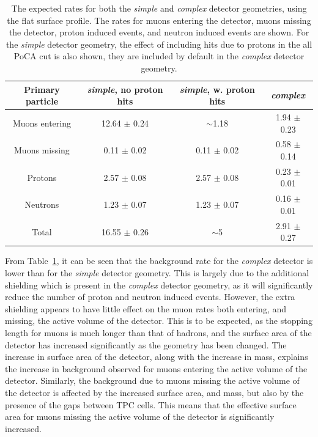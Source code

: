 \begin{table}[h!]
  \caption[The expected rates for both the \emph{simple} and \emph{complex} detector geometries, using the flat surface profile]
          {The expected rates for both the \emph{simple} and \emph{complex} detector geometries, using the flat surface profile. The rates for muons entering the detector, muons missing the detector, proton induced events, and neutron induced events are shown. For the \emph{simple} detector geometry, the effect of including hits due to protons in the all PoCA cut is also shown, they are included by default in the \emph{complex} detector geometry.}
  \centering
  \label{tab:SimpSurfRates}
  \begin{tabular}{c c c c}
    \toprule
        {Primary particle} & {\emph{simple}, no proton hits} & {\emph{simple}, w. proton hits} & {\emph{complex}} \\ 
        \midrule
        Muons entering     & 12.64 $\pm$ 0.24                & $\sim$1.18                      & 1.94 $\pm$ 0.23  \\

        Muons missing      & 0.11 $\pm$ 0.02                 & 0.11 $\pm$ 0.02                 & 0.58 $\pm$ 0.14  \\

        Protons            & 2.57 $\pm$ 0.08                 & 2.57 $\pm$ 0.08                 & 0.23 $\pm$ 0.01  \\

        Neutrons           & 1.23 $\pm$ 0.07                 & 1.23 $\pm$ 0.07                 & 0.16 $\pm$ 0.01  \\

        Total              & 16.55 $\pm$ 0.26                & $\sim$5                         & 2.91 $\pm$ 0.27  \\
    \bottomrule
  \end{tabular}
\end{table}

From Table~\ref{tab:SimpSurfRates}, it can be seen that the background rate for the \emph{complex} detector is lower than for the \emph{simple} detector geometry. This is largely due to the additional shielding which is present in the \emph{complex} detector geometry, as it will significantly reduce the number of proton and neutron induced events. However, the extra shielding appears to have little effect on the muon rates both entering, and missing, the active volume of the detector. This is to be expected, as the stopping length for muons is much longer than that of hadrons, and the surface area of the detector has increased significantly as the geometry has been changed. The increase in surface area of the detector, along with the increase in mass, explains the increase in background observed for muons entering the active volume of the detector. Similarly, the background due to muons missing the active volume of the detector is affected by the increased surface area, and mass, but also by the presence of the gaps between TPC cells. This means that the effective surface area for muons missing the active volume of the detector is significantly increased. \\

